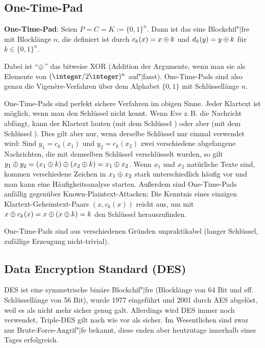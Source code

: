 \subsection{%
    One-Time-Pad%
}

\textbf{One-Time-Pad}:
Seien $P = C = K := \{0, 1\}^n$.
Dann ist das  eine Blockchif"|fre mit Blocklänge $n$,
die definiert ist durch $c_k(x) = x \oplus k$ und $d_k(y) = y \oplus k$ für $k \in \{0, 1\}^n$.

Dabei ist "`$\oplus$"' das bitweise XOR
(Addition der Argumente, wenn man sie als Elemente von $(\integer/2\integer)^n$ auf"|fasst).
One-Time-Pads sind also genau die Vigenère-Verfahren über dem Alphabet $\{0, 1\}$
mit Schlüssellänge $n$.

One-Time-Pads sind perfekt sichere Verfahren im obigen Sinne.
Jeder Klartext ist möglich, wenn man den Schlüssel nicht kennt.
Wenn Eve z.\,B. die Nachricht  abfängt, kann der Klartext  lauten
(mit dem Schlüssel ) oder aber  (mit dem Schlüssel ).
Dies gilt aber nur, wenn derselbe Schlüssel nur einmal verwendet wird:
Sind $y_1 = c_k(x_1)$ und $y_2 = c_k(x_2)$ zwei verschiedene abgefangene Nachrichten,
die mit demselben Schlüssel verschlüsselt wurden, so gilt
$y_1 \oplus y_2 = (x_1 \oplus k) \oplus (x_2 \oplus k) = x_1 \oplus x_2$.
Wenn $x_1$ und $x_2$ natürliche Texte sind, kommen verschiedene Zeichen in
$x_1 \oplus x_2$ stark unterschiedlich häufig vor und man kann eine Häufigkeitsanalyse starten.
Außerdem sind One-Time-Pads anfällig gegenüber Known-Plaintext-Attacken:
Die Kenntnis eines einzigen Klartext-Geheimtext-Paars $(x, c_k(x))$ reicht aus, um mit
$x \oplus c_k(x) = x \oplus (x \oplus k) = k$ den Schlüssel herauszufinden.

One-Time-Pads sind aus verschiedenen Gründen unpraktikabel
(langer Schlüssel, zufällige Erzeugung nicht-trivial).

\subsection{%
    Data Encryption Standard (DES)%
}

DES ist eine symmetrische binäre Blockchif"|fre
(Blocklänge von 64 Bit und eff. Schlüssellänge von 56 Bit), wurde 1977 eingeführt und 2001 durch
AES abgelöst, weil es als nicht mehr sicher genug galt.
Allerdings wird DES immer noch verwendet, Triple-DES gilt nach wie vor als sicher.
Im Wesentlichen sind zwar nur Brute-Force-Angrif"|fe bekannt,
diese enden aber heutzutage innerhalb eines Tages erfolgreich.

